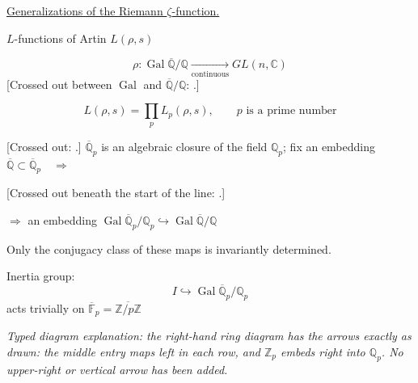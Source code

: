 \underline{Generalizations of the Riemann $\zeta$-function.}

$L$-functions of Artin \quad $L(\rho,s)$

\begin{equation*}
\rho:\operatorname{Gal}\overline{\mathbb{Q}}/\mathbb{Q}
\underset{\text{continuous}}{\longrightarrow} GL(n,\mathbb{C})
\end{equation*}
[Crossed out between $\operatorname{Gal}$ and $\overline{\mathbb{Q}}/\mathbb{Q}$:
.]

\begin{equation*}
L(\rho,s)=\prod_p L_p(\rho,s),\qquad p\text{ is a prime number}
\end{equation*}

[Crossed out:
.]
$\overline{\mathbb{Q}}_p$ is an algebraic closure of the field $\mathbb{Q}_p$; fix an embedding
$\overline{\mathbb{Q}}\subset\overline{\mathbb{Q}}_p\quad\Rightarrow$

[Crossed out beneath the start of the line:
.]

$\Rightarrow$ an embedding
$\operatorname{Gal}\overline{\mathbb{Q}}_p/\mathbb{Q}_p
\hookrightarrow\operatorname{Gal}\overline{\mathbb{Q}}/\mathbb{Q}$

Only the conjugacy class of these maps is invariantly determined.

Inertia group:
\begin{equation*}
I\hookrightarrow\operatorname{Gal}\overline{\mathbb{Q}}_p/\mathbb{Q}_p
\end{equation*}
acts trivially on $\overline{\mathbb{F}}_p=\overline{\mathbb{Z}/p\mathbb{Z}}$

\begin{center}
\end{center}
\par\noindent\textit{Typed diagram explanation: the right-hand ring diagram has the arrows exactly as drawn: the middle entry maps left in each row, and $\mathbb Z_p$ embeds right into $\mathbb Q_p$. No upper-right or vertical arrow has been added.}\par


